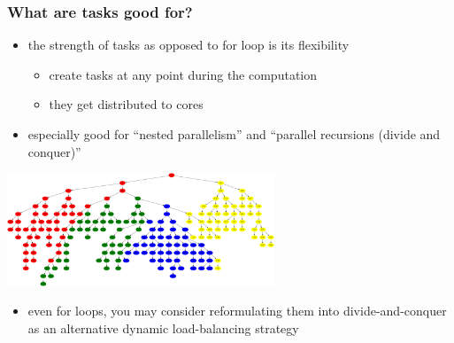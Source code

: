 \documentclass[12pt,dvipdfmx]{beamer}
\begin{document}
\begin{frame}
  \frametitle{What are tasks good for?}
  \begin{itemize}
  \item the strength of tasks as opposed to for loop is its flexibility
    \begin{itemize}
    \item create tasks at any point during the computation
    \item they get distributed to cores
    \end{itemize}
  \item especially good for ``nested parallelism'' and ``parallel recursions
    (divide and conquer)''
  \end{itemize}

  \begin{center}
    \includegraphics[width=0.6\textwidth]{out/pdf/svg/randtree.pdf}
  \end{center}

  \begin{itemize}
  \item even for loops, you may consider reformulating
    them into divide-and-conquer as an alternative dynamic
    load-balancing strategy
  \end{itemize}
\end{frame}
\end{document}
